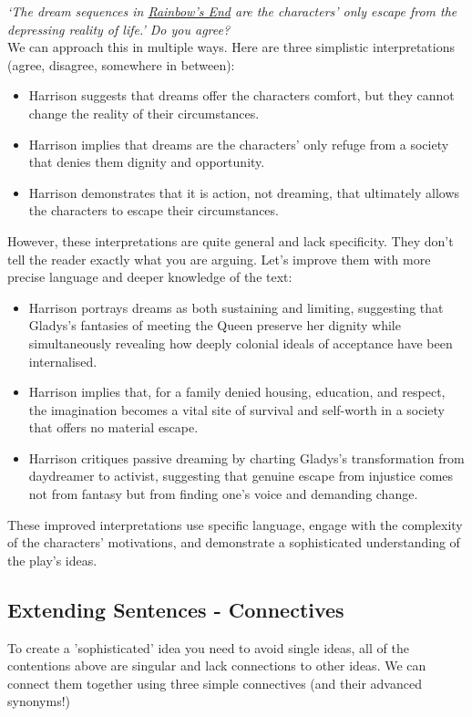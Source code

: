 \documentclass[a4paper]{article}
\begin{document}
\textit{`The dream sequences in \underline{Rainbow's End} are the characters' only escape from the depressing reality of life.' Do you agree?}\\
We can approach this in multiple ways. Here are three simplistic interpretations (agree, disagree, somewhere in between):
\begin{itemize}
    \item Harrison suggests that dreams offer the characters comfort, but they cannot change the reality of their circumstances.

\item Harrison implies that dreams are the characters' only refuge from a society that denies them dignity and opportunity.

\item Harrison demonstrates that it is action, not dreaming, that ultimately allows the characters to escape their circumstances.
\end{itemize}

However, these interpretations are quite general and lack specificity. They don’t tell the reader exactly what you are arguing. Let’s improve them with more precise language and deeper knowledge of the text:

\begin{itemize}
    \item Harrison portrays dreams as both sustaining and limiting, suggesting that Gladys’s fantasies of meeting the Queen preserve her dignity while simultaneously revealing how deeply colonial ideals of acceptance have been internalised.

\item Harrison implies that, for a family denied housing, education, and respect, the imagination becomes a vital site of survival and self-worth in a society that offers no material escape.

\item Harrison critiques passive dreaming by charting Gladys’s transformation from daydreamer to activist, suggesting that genuine escape from injustice comes not from fantasy but from finding one’s voice and demanding change.
\end{itemize}

These improved interpretations use specific language, engage with the complexity of the characters’ motivations, and demonstrate a sophisticated understanding of the play’s ideas.

\subsection{Extending Sentences - Connectives}
To create a 'sophisticated' idea you need to avoid single ideas, all of the contentions above are singular and lack connections to other ideas. We can connect them together using three simple connectives (and their advanced synonyms!)
\end{document}
